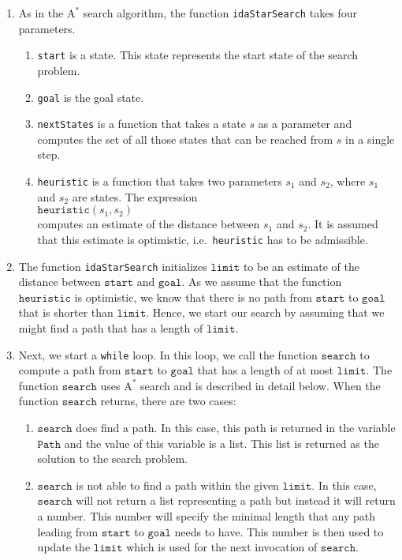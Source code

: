 \begin{enumerate}
\item As in the $\mathrm{A}^*$ search algorithm, the function \texttt{idaStarSearch} takes four parameters.
      \begin{enumerate}
      \item \texttt{start} is a state.  This state represents the start state of the search problem.
      \item \texttt{goal} is the goal state.
      \item \texttt{nextStates} is a function that takes a state $s$ as a parameter and
            computes the set of all those states that can be reached from $s$ in a single step.
      \item \texttt{heuristic} is a function that takes two parameters $s_1$ and $s_2$, where $s_1$ and $s_2$
            are states. The expression
            \\[0.2cm]
            \hspace*{1.3cm}
            $\texttt{heuristic}(s_1, s_2)$
            \\[0.2cm]
            computes an estimate of the distance between $s_1$ and $s_2$.  It is assumed that this
            estimate is optimistic, i.e.~\texttt{heuristic} has to be admissible.
     \end{enumerate}
\item The function \texttt{idaStarSearch} initializes $\texttt{limit}$ to be an estimate of the distance
      between $\texttt{start}$ and $\texttt{goal}$.  As we assume that the function $\texttt{heuristic}$ is
      optimistic, we know that there is no path from $\texttt{start}$ to $\texttt{goal}$ that is shorter than
      $\texttt{limit}$.  Hence, we start our search by assuming that we might find a path that has a length of
      $\texttt{limit}$.
\item Next, we start a \texttt{while} loop.  In this loop, we call the function $\texttt{search}$ to compute a path from
      $\texttt{start}$ to $\texttt{goal}$ that has a length of at most $\texttt{limit}$.  The function
      $\texttt{search}$ uses $\mathrm{A}^*$ search and is described in detail below.
      When the function $\texttt{search}$ returns, there are two cases:
      \begin{enumerate}
      \item $\texttt{search}$ does find a path.  In this case, this path is returned in the variable
            $\texttt{Path}$ and the value of this variable is a list.  This list is returned as the solution to
            the search problem.
      \item $\texttt{search}$ is not able to find a path within the given $\texttt{limit}$.  In this case,
            $\texttt{search}$ will not return a list representing a path but instead it will return a number.
            This number will specify the minimal length that any path leading from $\texttt{start}$ to $\texttt{goal}$ needs to
            have.  This number is then used to update the $\texttt{limit}$ which is used for the next
            invocation of $\texttt{search}$.


\end{enumerate}
\end{enumerate}
